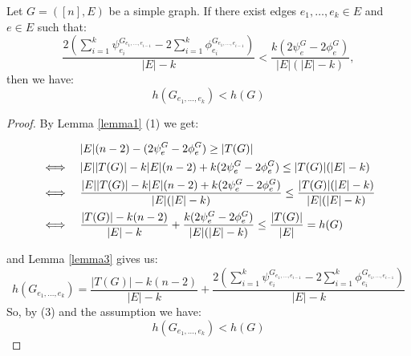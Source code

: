 \begin{prop}\label{proposition2}
Let \(G=([n],E)\) be a simple graph. If there exist edges \(e_1,\ldots,e_k\in E\) and \(e\in E\) such that:
\[
\frac{2(\sum\limits_{i=1}^k\psi_{e_i}^{G_{e_1,\ldots,e_{i-1}}}-2\sum\limits_{i=1}^k\phi_{e_i}^{G_{e_1,\ldots,e_{i-1}}})}{|E|-k}<\frac{k(2\psi_e^G-2\phi_e^G)}{|E|(|E|-k)},
\]
then we have:
\[
h(G_{e_1,\ldots,e_k})<h(G)
\]
\begin{proof}
By Lemma \ref{lemma1} (1) we get:
\begin{doublespace}
\begin{align}
&\quad\quad\quad\:\, |E|(n-2)-(2\psi_e^G-2\phi_e^G)\geq |T(G)|\notag\\
&\Longleftrightarrow\quad |E||T(G)|-k|E|(n-2)+k(2\psi_e^G-2\phi_e^G)\leq |T(G)|(|E|-k)\notag\\
&\Longleftrightarrow\quad \frac{|E||T(G)|-k|E|(n-2)+k(2\psi_e^G-2\phi_e^G)}{|E|(|E|-k)}\leq\frac{|T(G)|(|E|-k)}{|E|(|E|-k)}\notag\\
&\Longleftrightarrow\quad \frac{|T(G)|-k(n-2)}{|E|-k}+\frac{k(2\psi_e^G-2\phi_e^G)}{|E|(|E|-k)}\leq\frac{|T(G)|}{|E|}=h(G)
\end{align}
\end{doublespace}
and Lemma \ref{lemma3} gives us:
\[
h(G_{e_1,\ldots,e_k})=\frac{|T(G)|-k(n-2)}{|E|-k}+\frac{2(\sum\limits_{i=1}^k\psi_{e_i}^{G_{e_1,\ldots,e_{i-1}}}-2\sum\limits_{i=1}^k\phi_{e_i}^{G_{e_1,\ldots,e_{i-1}}})}{|E|-k}
\]
So, by (3) and the assumption we have:
\[
h(G_{e_1,\ldots,e_k})<h(G)
\]
\end{proof}
\end{prop}

